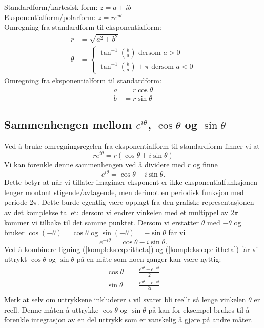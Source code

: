 \documentclass[a4paper,norsk,12pt]{article}
\begin{document}
\begin{tsummary}
Standardform/kartesisk form: $z = a + ib$ \\
Eksponentialform/polarform: $z = re^{i\theta}$ \\[12pt]

Omregning fra standardform til eksponentialform:
\begin{align*}
	r &= \sqrt{a^2+b^2} \\
	\theta &= \begin{cases} 
		\tan^{-1}\left(\frac{b}{a}\right) \text{ dersom } a>0 \\
		\tan^{-1}\left(\frac{b}{a}\right)+\pi \text{ dersom } a <0
	\end{cases}
\end{align*}
Omregning fra eksponentialform til standardform:
\begin{align*}
	a &= r\cos\theta \\
	b &= r\sin\theta
\end{align*}
\end{tsummary}

\subsection{Sammenhengen mellom $e^{i\theta}$, $\cos\theta$ og $\sin\theta$}
Ved å bruke omregningsregelen fra eksponentialform til standardform finner vi at
\begin{displaymath}
	re^{i\theta} = r(\cos\theta + i\sin\theta)
\end{displaymath}
Vi kan forenkle denne sammenhengen ved å dividere med $r$ og finne
\begin{equation}
	\label{kompleks:eq:eitheta}
	e^{i\theta} = \cos\theta + i\sin\theta.
\end{equation}
Dette betyr at når vi tillater imaginær eksponent er ikke eksponentialfunksjonen lenger montont stigende/avtagende, men derimot en periodisk funksjon med periode $2\pi$. Dette burde egentlig være opplagt fra den grafiske representasjonen av det komplekse tallet: dersom vi endrer vinkelen med et multippel av $2\pi$ kommer vi tilbake til det samme punktet. Dersom vi erstatter $\theta$ med $-\theta$ og bruker $\cos(-\theta) = \cos\theta$ og $\sin(-\theta) = -\sin\theta$ får vi
\begin{equation}
	\label{kompleks:eq:e-itheta}
	e^{-i\theta} = \cos\theta - i\sin\theta.
\end{equation}
Ved å kombinere ligning (\ref{kompleks:eq:eitheta}) og (\ref{kompleks:eq:e-itheta}) får vi uttrykt $\cos\theta$ og $\sin\theta$ på en måte som noen ganger kan være nyttig:
\begin{align*}
	\cos\theta &= \frac{e^{i\theta}+e^{-i\theta}}{2} \\
	\sin\theta &= \frac{e^{i\theta}-e^{-i\theta}}{2i} \\
\end{align*}
Merk at selv om uttrykkene inkluderer $i$ vil svaret bli reellt så lenge vinkelen $\theta$ er reell. Denne måten å uttrykke $\cos\theta$ og $\sin\theta$ på kan for eksempel brukes til å forenkle integrasjon av en del uttrykk som er vanskelig å gjøre på andre måter.
\end{document}
